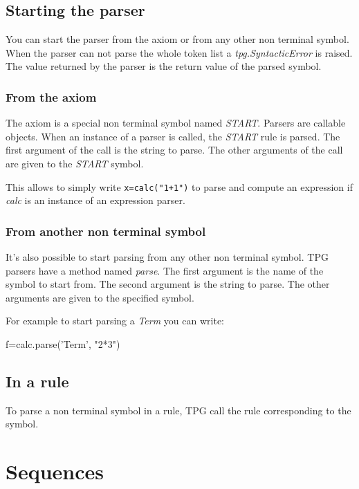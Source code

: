 \subsection{Starting the parser}

You can start the parser from the axiom or from any other non terminal symbol.
When the parser can not parse the whole token list a \emph{tpg.SyntacticError} is raised.
The value returned by the parser is the return value of the parsed symbol.

\subsubsection{From the axiom}

The axiom is a special non terminal symbol named \emph{START}.
Parsers are callable objects.
When an instance of a parser is called, the \emph{START} rule is parsed.
The first argument of the call is the string to parse.
The other arguments of the call are given to the \emph{START} symbol.

This allows to simply write \verb!x=calc("1+1")! to parse and compute an expression if \emph{calc} is an instance of an expression parser.

\subsubsection{From another non terminal symbol}

It's also possible to start parsing from any other non terminal symbol.
TPG parsers have a method named \emph{parse}.
The first argument is the name of the symbol to start from.
The second argument is the string to parse.
The other arguments are given to the specified symbol.

For example to start parsing a \emph{Term}
you can write:
\begin{verbatimtab}[4]
	f=calc.parse('Term', "2*3")
\end{verbatimtab}

\subsection{In a rule}

To parse a non terminal symbol in a rule, TPG call the rule corresponding to the symbol.

\section{Sequences}												\label{parser:sequences}

